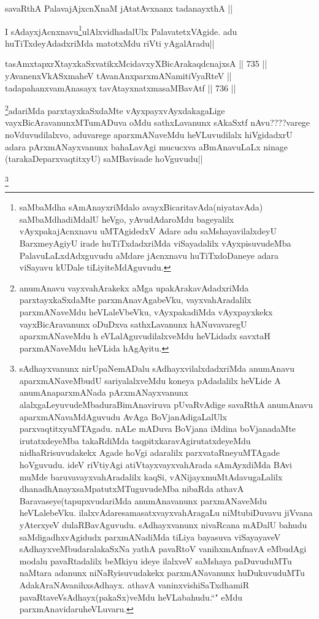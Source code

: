 \begin{shl}
savaRthA PalavajAjxcnXnaM jAtatAvxnanx tadanayxthA || \\
\end{shl}

\begin{artha}
I sAdayxjAcnxnavu\footnote{saMbaMdha sAmAnayxriMdalo avayxBicaritavAda(niyatavAda) saMbaMdhadiMdalU heVgo, yAvudAdaroMdu bageyalilx vAyxpakajAcnxnavu uMTAgidedxV Adare adu saMshayavilalxdeyU BarxmeyAgiyU irade huTiTxdadxriMda viSayadalilx vAyxpisuvudeMba  PalavuLaLxdAdxguvudu aMdare jAcnxnavu huTiTxdoDaneye adara viSayavu kUDale tiLiyiteMdAguvudu.}ulAlxvidhadalUlx PalavatetxVAgide. adu huTiTxdeyAdadxriMda matotxMdu riVti yAgalAradu||
\end{artha}

\begin{shl}
tasAmxtapxrXtayxkaSxvatikxMcidavxyXBicArakaqdcnajxsA ||  735 ||  
yAvanenxVkASxmaheV tAvanAnxparxmANamitiVyaRteV || \\
tadapahanxvamAnasayx tavAtayxnatxmasaMBavAtf ||  736 ||  
\end{shl}

\begin{artha}
\footnote{anumAnavu vayxvahArakekx aMga upakArakavAdadxriMda parxtayxkaSxdaMte parxmAnavAgabeVku, vayxvahAradalilx parxmANaveMdu heVLaleVbeVku, vAyxpakadiMda vAyxpayxkekx vayxBicAravanunx oDuDxva sathxLavanunx hANuvavaregU aparxmANaveMdu h eVLalAguvudilalxveMdu heVLidadx savxtaH parxmANaveMdu heVLida hAgAyitu.}adariMda parxtayxkaSxdaMte vAyxpayxvAyxdakagaLige vayxBicAravanunxMTumADuva oMdu sathxLavanunx sAkaSxtf nAvu????varege noVduvudilalxvo, aduvarege aparxmANaveMdu heVLuvudilalx hiVgidadxrU adara pArxmANayxvanunx bahaLavAgi mucucxva aBmAnavuLaLx ninage (tarakaDeparxvaqtitxyU) saMBavisade hoVguvudu||
\end{artha}

\begin{artha}
\footnote{sAdhayxvanunx nirUpaNemADalu sAdhayxvilalxdadxriMda anumAnavu aparxmANaveMbudU sariyalalxveMdu koneya pAdadalilx heVLide A anumAnaparxmANada pArxmANayxvanunx alalxgaLeyuvudeMbaduraBimAnaviruva pUvaRvAdige savaRthA anumAnavu aparxmANavaMdAguvudu AvAga BoVjanAdigaLalUlx parxvaqtitxyuMTAgadu. nALe mADuva BoVjana iMdina boVjanadaMte irutatxdeyeMba takaRdiMda taqpitxkaravAgirutatxdeyeMdu nidhaRrisuvudakekx Agade hoVgi adaralilx parxvataRneyuMTAgade hoVguvudu. ideV riVtiyAgi atiVtayxvayxvahArada sAmAyxdiMda BAvi muMde baruvavayxvahAradalilx kaqSi, vANijayxmuMtAdavugaLalilx dhanadhAnayxsaMpatutxMTuguvudeMba nibaRda athavA Baravaseye(tapupxvudariMda anumAnavanunx parxmANaveMdu heVLalebeVku. ilalxvAdaresamasatxvayxvahAragaLu niMtubiDuvavu jiVvana yAterxyeV dulaRBavAguvudu. sAdhayxvanunx nivaRcana mADalU bahudu saMdigadhxvAgidudx parxmANadiMda tiLiya bayasuva viSayayaveV sAdhayxveMbudaralakaSxNa yathA pavaRtoV vanihxmAnfnavA eMbudAgi modalu pavaRtadalilx beMkiyu ideye ilalxveV saMshaya paDuvuduMTu naMtara adanunx niNaRyisuvudakekx parxmANavanunx huDukuvuduMTu AdakAraNAvanihxsAdhayx. athavA vaninxvishiSaTxdhamiR pavaRtaveVsAdhayx(pakaSx)veMdu heVLabahudu.``\stext" eMdu parxmAnavidaruheVLuvaru.}
\end{artha}

